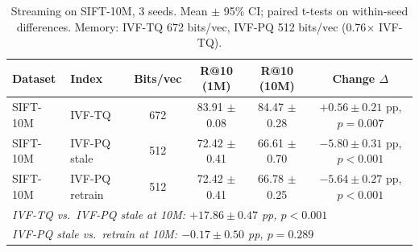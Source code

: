 \begin{table}[t]
\caption{Streaming on SIFT-10M, 3 seeds. Mean $\pm$ 95\% CI; paired t-tests on within-seed differences. Memory: IVF-TQ 672 bits/vec, IVF-PQ 512 bits/vec (0.76$\times$ IVF-TQ).}
\label{tab:streaming_sift10m_multiseed}
\centering\small
\begin{tabular}{llcccc}
\toprule
Dataset & Index & Bits/vec & R@10 (1M) & R@10 (10M) & Change $\Delta$ \\
\midrule
  SIFT-10M & IVF-TQ & 672 & 83.91 $\pm$ 0.08 & 84.47 $\pm$ 0.28 & $+0.56 \pm 0.21$ pp, $p=0.007$ \\
  SIFT-10M & IVF-PQ stale & 512 & 72.42 $\pm$ 0.41 & 66.61 $\pm$ 0.70 & $-5.80 \pm 0.31$ pp, $p<0.001$ \\
  SIFT-10M & IVF-PQ retrain & 512 & 72.42 $\pm$ 0.41 & 66.78 $\pm$ 0.25 & $-5.64 \pm 0.27$ pp, $p<0.001$ \\
\midrule
\multicolumn{6}{l}{\textit{IVF-TQ vs.\ IVF-PQ stale at 10M: $+17.86 \pm 0.47$ pp, $p<0.001$}} \\
\multicolumn{6}{l}{\textit{IVF-PQ stale vs.\ retrain at 10M: $-0.17 \pm 0.50$ pp, $p=0.289$}} \\
\bottomrule
\end{tabular}
\end{table}
